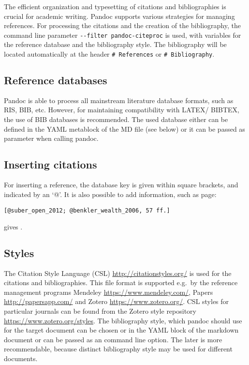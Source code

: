 \documentclass[10pt,fleqn]{wlpeerj}
\begin{document}
The
efficient
organization
and
typesetting
of
citations
and
bibliographies
is
crucial
for
academic
writing.
Pandoc
supports
various
strategies
for
managing
references.
For
processing
the
citations
and
the
creation
of
the
bibliography,
the
command
line
parameter
\texttt{-\/-filter\ pandoc-citeproc}
is
used,
with
variables
for
the
reference
database
and
the
bibliography
style.
The
bibliography
will
be
located
automatically
at
the
header
\texttt{\#\ References}
or
\texttt{\#\ Bibliography}.

\subsection{Reference
databases}\label{reference-databases}

Pandoc
is
able
to
process
all
mainstream
literature
database
formats,
such
as
RIS,
BIB,
etc.
However,
for
maintaining
compatibility
with
LATEX/
BIBTEX,
the
use
of
BIB
databases
is
recommended.
The
used
database
either
can
be
defined
in
the
YAML
metablock
of
the
MD
file
(see
below)
or it
can
be
passed
as
parameter
when
calling
pandoc.

\subsection{Inserting
citations}\label{inserting-citations}

For
inserting
a
reference,
the
database
key
is
given
within
square
brackets,
and
indicated
by an
`@'.
It is
also
possible
to
add
information,
such
as
page:

\begin{verbatim}
[@suber_open_2012; @benkler_wealth_2006, 57 ff.]
\end{verbatim}

gives
\citep[57
ff.]{suber_open_2012, benkler_wealth_2006}.

\subsection{Styles}\label{styles}

The
Citation
Style
Language
(CSL)
\url{http://citationstyles.org/}
is
used
for
the
citations
and
bibliographies.
This
file
format
is
supported
e.g.~by
the
reference
management
programs
Mendeley
\url{https://www.mendeley.com/},
Papers
\url{http://papersapp.com/}
and
Zotero
\url{https://www.zotero.org/}.
CSL
styles
for
particular
journals
can
be
found
from
the
Zotero
style
repository
\url{https://www.zotero.org/styles}.
The
bibliography
style,
which
pandoc
should
use
for
the
target
document
can
be
chosen
or in
the
YAML
block
of
the
markdown
document
or
can
be
passed
as an
command
line
option.
The
later
is
more
recommendable,
because
distinct
bibliography
style
may
be
used
for
different
documents.
\end{document}
